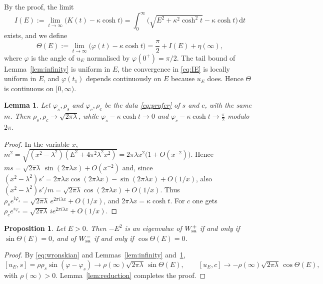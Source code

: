 \documentclass[11pt]{amsart}
\newtheorem{proposition}[theorem]{Proposition}
\newtheorem{lemma}[theorem]{Lemma}
\theoremstyle{definition}
\newcommand{\dd}{\,\mathrm{d}}
\begin{document}
By the proof, the limit
\begin{equation}\label{eq:IE}
I(E):=\lim_{t\to\infty}\big(K(t)-\kappa\cosh t\big)=\int_0^\infty\Big(\sqrt{E^2+\kappa^2\cosh^2t}-\kappa\cosh t\Big)\dd t
\end{equation}
exists, and we define
\begin{equation}\label{eq:Theta}
\Theta(E):=\lim_{t\to\infty}\big(\varphi(t)-\kappa\cosh t\big)=\frac\pi2+I(E)+\eta(\infty),
\end{equation}
where $\varphi$ is the angle of $u_E$ normalised by $\varphi(0^+)=\pi/2$. The tail bound of Lemma~\ref{lem:infinity} is uniform in $E$, the convergence in \eqref{eq:IE} is locally uniform in $E$, and $\varphi(t_1)$ depends continuously on $E$ because $u_E$ does. Hence $\Theta$ is continuous on $[0,\infty)$.

\begin{lemma}\label{lem:reference}
Let $\varphi_s,\rho_s$ and $\varphi_c,\rho_c$ be the data \eqref{eq:prufer} of $s$ and $c$, with the same $m$. Then $\rho_s,\rho_c\to\sqrt{2\pi\lambda}$, while $\varphi_s-\kappa\cosh t\to0$ and $\varphi_c-\kappa\cosh t\to\frac\pi2$ modulo $2\pi$.
\end{lemma}

\begin{proof}
In the variable $x$, $m^2=\sqrt{(x^2-\lambda^2)(E^2+4\pi^2\lambda^2x^2)}=2\pi\lambda x^2\big(1+O(x^{-2})\big)$. Hence $ms=\sqrt{2\pi\lambda}\,\sin(2\pi\lambda x)+O(x^{-2})$ and, since $(x^2-\lambda^2)s'=2\pi\lambda x\cos(2\pi\lambda x)-\sin(2\pi\lambda x)+O(1/x)$, also $(x^2-\lambda^2)s'/m=\sqrt{2\pi\lambda}\cos(2\pi\lambda x)+O(1/x)$. Thus $\rho_se^{i\varphi_s}=\sqrt{2\pi\lambda}\,e^{2\pi i\lambda x}+O(1/x)$, and $2\pi\lambda x=\kappa\cosh t$. For $c$ one gets $\rho_ce^{i\varphi_c}=\sqrt{2\pi\lambda}\,ie^{2\pi i\lambda x}+O(1/x)$.
\end{proof}

\begin{proposition}\label{prop:criterion}
Let $E>0$. Then $-E^2$ is an eigenvalue of $W_{\rm sa}^+$ if and only if $\sin\Theta(E)=0$, and of $W_{\rm sa}^-$ if and only if $\cos\Theta(E)=0$.
\end{proposition}

\begin{proof}
By \eqref{eq:wronskian} and Lemmas~\ref{lem:infinity} and~\ref{lem:reference},
\[
[u_E,s]=\rho\rho_s\sin(\varphi-\varphi_s)\longrightarrow\rho(\infty)\sqrt{2\pi\lambda}\,\sin\Theta(E),\qquad [u_E,c]\longrightarrow-\rho(\infty)\sqrt{2\pi\lambda}\,\cos\Theta(E),
\]
with $\rho(\infty)>0$. Lemma~\ref{lem:reduction} completes the proof.
\end{proof}
\end{document}
